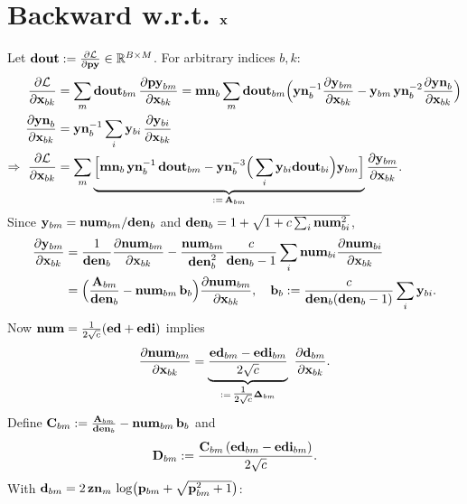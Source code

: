\documentclass{article}
\begin{document}

\section{Backward w.r.t. $\v{x}$}

Let $\v{dout}:=\ddfrac{\mathcal{L}}{\v{py}}\in\mathbb{R}^{B\times M}$. For arbitrary indices $b,k$:
\begin{align}
\ddfrac{\mathcal{L}}{\v{x}{bk}}
&= \sum_m \v{dout}{bm}\,\ddfrac{\v{py}{bm}}{\v{x}{bk}}
= \v{mn}_b \sum_m \v{dout}{bm}\Big(\v{yn}_b^{-1}\ddfrac{\v{y}{bm}}{\v{x}{bk}} - \v{y}{bm}\,\v{yn}_b^{-2}\ddfrac{\v{yn}_b}{\v{x}{bk}}\Big) \\
\ddfrac{\v{yn}_b}{\v{x}{bk}} &= \v{yn}_b^{-1}\sum_i \v{y}{bi}\,\ddfrac{\v{y}{bi}}{\v{x}{bk}} \\
\Rightarrow\ \ddfrac{\mathcal{L}}{\v{x}{bk}}
&= \sum_m \underbrace{\Big[\v{mn}_b\,\v{yn}_b^{-1}\,\v{dout}{bm}
- \v{yn}_b^{-3}\Big(\sum_i \v{y}{bi}\v{dout}{bi}\Big)\v{y}{bm}\Big]}_{:=\,\v{A}{bm}}
\ddfrac{\v{y}{bm}}{\v{x}{bk}}.
\end{align}
Since $\v{y}{bm}=\v{num}{bm}/\v{den}{b}$ and $\v{den}{b} = 1+\sqrt{1+c\sum_i \v{num}{bi}^2}$,
\begin{align}
\ddfrac{\v{y}{bm}}{\v{x}{bk}}
&= \frac{1}{\v{den}{b}}\ddfrac{\v{num}{bm}}{\v{x}{bk}}
- \frac{\v{num}{bm}}{\v{den}{b}^2}\frac{c}{\v{den}{b}-1}\sum_i \v{num}{bi}\ddfrac{\v{num}{bi}}{\v{x}{bk}} \\
&= \Big(\frac{\v{A}{bm}}{\v{den}{b}} - \v{num}{bm}\,\v{b}{b}\Big)\ddfrac{\v{num}{bm}}{\v{x}{bk}},\quad
\v{b}{b}:=\frac{c}{\v{den}{b}(\v{den}{b}-1)}\sum_{i} \v{y}{bi}.
\end{align}
Now $\v{num}=\tfrac{1}{2\sqrt{c}}(\v{ed}+\v{edi})$ implies
\begin{align}
\ddfrac{\v{num}{bm}}{\v{x}{bk}}
= \underbrace{\frac{\v{ed}{bm}-\v{edi}{bm}}{2\sqrt{c}}}_{:=\,\tfrac{1}{2\sqrt{c}}\v{\Delta}{bm}}\ \ddfrac{\v{d}{bm}}{\v{x}{bk}}.
\end{align}
Define $\v{C}{bm}:=\frac{\v{A}{bm}}{\v{den}{b}} - \v{num}{bm}\,\v{b}{b}$ and
\[
\v{D}{bm}:=\frac{\v{C}{bm}\,(\v{ed}{bm}-\v{edi}{bm})}{2\sqrt{c}}.
\]
With $\v{d}{bm}=2\,\v{zn}{m}\,\log\!\big(\v{p}{bm}+\sqrt{\v{p}{bm}^2+1}\big)$:
\end{document}
